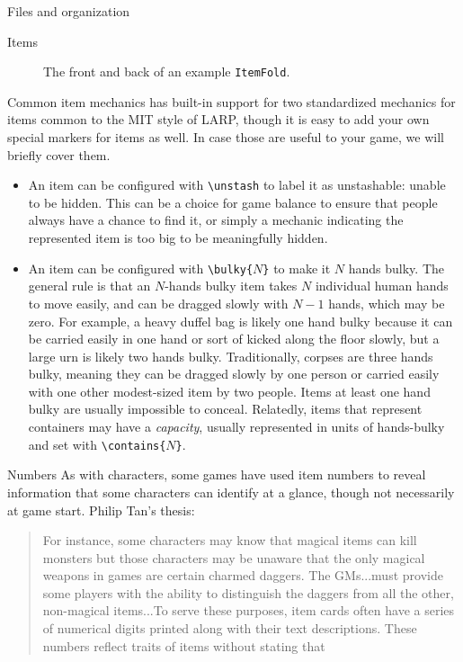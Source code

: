\documentclass[sheet]{GameTexBase}
\begin{document}
\begin{section}{Files and organization}
\begin{subsection}{Items}
\begin{figure}
\caption{The front and back of an example \lstinline|ItemFold|.}
\label{itemfoldfig}
\end{figure}

\begin{subsubsection}{Common item mechanics}
\gametex{} has built-in support for two standardized mechanics for items common to the MIT style of LARP, though it is easy to add your own special markers for items as well.  In case those are useful to your game, we will briefly cover them.
\begin{itemize}
\item An item can be configured with \lstinline|\unstash| to label it as unstashable: unable to be hidden.  This can be a choice for game balance to ensure that people always have a chance to find it, or simply a mechanic indicating the represented item is too big to be meaningfully hidden.
\item An item can be configured with \texttt{\textbackslash{}bulky\{$N$\}} to make it $N$ hands bulky.  The general rule is that an $N$-hands bulky item takes $N$ individual human hands to move easily, and can be dragged slowly with $N-1$ hands, which may be zero.  For example, a heavy duffel bag is likely one hand bulky because it can be carried easily in one hand or sort of kicked along the floor slowly, but a large urn is likely two hands bulky.  Traditionally, corpses are three hands bulky, meaning they can be dragged slowly by one person or carried easily with one other modest-sized item by two people.  Items at least one hand bulky are usually impossible to conceal.  Relatedly, items that represent containers may have a \emph{capacity}, usually represented in units of hands-bulky and set with \texttt{\textbackslash{}contains\{$N$\}}.
\end{itemize}
\end{subsubsection}
\begin{subsubsection}{Numbers}
As with characters, some games have used item numbers to reveal information that some characters can identify at a glance, though not necessarily at game start.  Philip Tan's thesis:
\begin{quote}
For instance, some characters may know that magical items can kill monsters but those
characters may be unaware that the only magical weapons in games are certain charmed
daggers. The GMs...must provide some players with the
ability to distinguish the daggers from all the other, non-magical items...To serve these purposes, item cards often have a series of numerical digits printed along
with their text descriptions. These numbers reflect traits of items without stating that

\end{quote}
\end{subsubsection}
\end{subsection}
\end{section}
\end{document}
